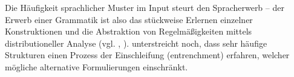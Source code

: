 Die Häufigkeit sprachlicher Muster im Input steurt den Spracherwerb -- der Erwerb einer Grammatik ist also das stückweise Erlernen einzelner Konstruktionen und die Abstraktion von Regelmäßigkeiten mittels distributioneller Analyse (vgl. \cite{Ellis08}, \cite{Bybee06}).
\cite{Bybee06} unterstreicht noch, dass sehr häufige Strukturen einen Prozess der Einschleifung (entrenchment) erfahren, welcher mögliche alternative Formulierungen einschränkt.










